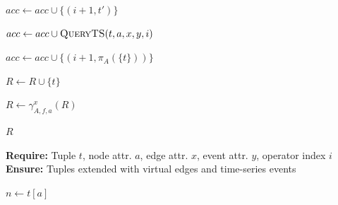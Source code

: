\begin{algorithm}[htp]
\begin{algorithmic}[1]
                \State $acc \gets acc \cup \{(i+1,t')\}$
                \label{alg:search:expand-gs}

            \EndFor
             
                \State $acc \gets acc \cup
                \textsc{QueryTS}(t,a,x,y,i)$
                \label{alg:search:expand-ts}
            \EndIf

        \EndCase

        \label{alg:search:projection-case}

            \State $acc \gets acc \cup
                \{(i+1,\pi_A(\{t\}))\}$
            \label{alg:search:projection}

        \EndCase

        \label{alg:search:default-case}
            \State $R \gets R \cup \{t\}$
            \label{alg:search:result}
        \EndCase

    \EndSwitch

\EndWhile

\label{alg:search:aggregation-test}

    \State $R \gets \gamma^x_{A,f,a}(R)$
    \label{alg:search:aggregation}

\EndIf

\State \Return $R$
\label{alg:search:return}

\item[]

\label{proc:query-push-down}

\Statex \hspace{\algorithmicindent}\textbf{Require:} Tuple $t$, node attr. $a$, edge attr. $x$, event attr. $y$, operator index $i$
\Statex \hspace{\algorithmicindent}\textbf{Ensure:} Tuples extended with virtual edges and time-series events

    \State $n \gets t[a]$
    \label{proc:qpd:get-node}


\end{algorithmic}
\end{algorithm}
